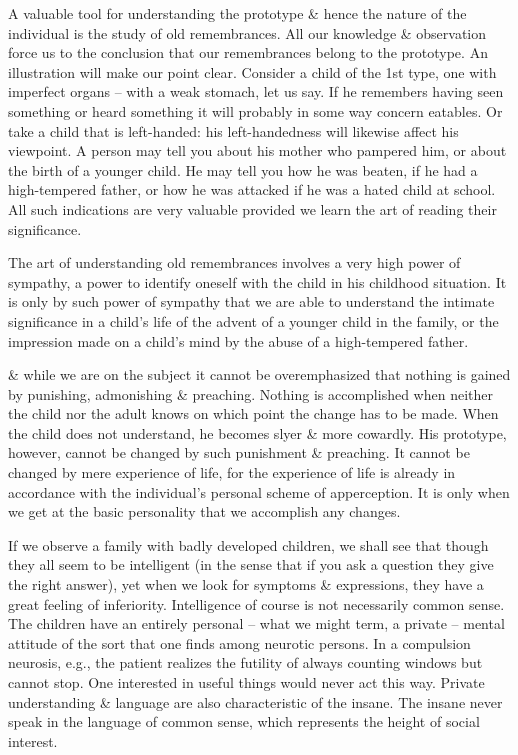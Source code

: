 \documentclass{article}
\numberwithin{equation}{section}
\begin{document}
A valuable tool for understanding the prototype \& hence the nature of the individual is the study of old remembrances. All our knowledge \& observation force us to the conclusion that our remembrances belong to the prototype. An illustration will make our point clear. Consider a child of the 1st type, one with imperfect organs -- with a weak stomach, let us say. If he remembers having seen something or heard something it will probably in some way concern eatables. Or take a child that is left-handed: his left-handedness will likewise affect his viewpoint. A person may tell you about his mother who pampered him, or about the birth of a younger child. He may tell you how he was beaten, if he had a high-tempered father, or how he was attacked if he was a hated child at school. All such indications are very valuable provided we learn the art of reading their significance.

The art of understanding old remembrances involves a very high power of sympathy, a power to identify oneself with the child in his childhood situation. It is only by such power of sympathy that we are able to understand the intimate significance in a child's life of the advent of a younger child in the family, or the impression made on a child's mind by the abuse of a high-tempered father.

\& while we are on the subject it cannot be overemphasized that nothing is gained by punishing, admonishing \& preaching. Nothing is accomplished when neither the child nor the adult knows on which point the change has to be made. When the child does not understand, he becomes slyer \& more cowardly. His prototype, however, cannot be changed by such punishment \& preaching. It cannot be changed by mere experience of life, for the experience of life is already in accordance with the individual's personal scheme of apperception. It is only when we get at the basic personality that we accomplish any changes.

If we observe a family with badly developed children, we shall see that though they all seem to be intelligent (in the sense that if you ask a question they give the right answer), yet when we look for symptoms \& expressions, they have a great feeling of inferiority. Intelligence of course is not necessarily common sense. The children have an entirely personal -- what we might term, a private -- mental attitude of the sort that one finds among neurotic persons. In a compulsion neurosis, e.g., the patient realizes the futility of always counting windows but cannot stop. One interested in useful things would never act this way. Private understanding \& language are also characteristic of the insane. The insane never speak in the language of common sense, which represents the height of social interest.
\end{document}
